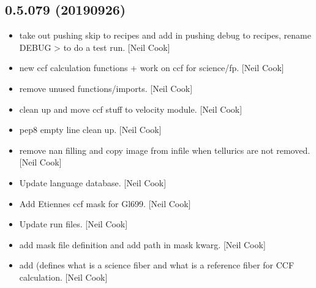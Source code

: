 \documentclass[a4paper,10pt,english]{report}
\begin{document}
\subsection{0.5.079 (2019\sphinxhyphen{}09\sphinxhyphen{}26)}
\label{\detokenize{misc/changelog:id83}}\begin{itemize}
\item {} 
 \sphinxhyphen{} take out pushing skip to recipes
and add in pushing debug to recipes, rename DEBUG \textendash{}\textgreater{}  to do a
test run. {[}Neil Cook{]}

\item {} 
 \sphinxhyphen{} new ccf calculation functions + work on
ccf for science/fp. {[}Neil Cook{]}

\item {} 
 \sphinxhyphen{} remove unused functions/imports.
{[}Neil Cook{]}

\item {} 
 \sphinxhyphen{} clean up and move ccf stuff to velocity
module. {[}Neil Cook{]}

\item {} 
 \sphinxhyphen{} pep8 empty line clean up. {[}Neil Cook{]}

\item {} 
 \sphinxhyphen{} remove nan filling and copy image from infile when
tellurics are not removed. {[}Neil Cook{]}

\item {} 
Update language database. {[}Neil Cook{]}

\item {} 
Add Etiennes ccf mask for Gl699. {[}Neil Cook{]}

\item {} 
Update run files. {[}Neil Cook{]}

\item {} 
 \sphinxhyphen{} add mask file
definition and add path in \textendash{}mask kwarg. {[}Neil Cook{]}

\item {} 
 \sphinxhyphen{} add  (defines what is a
science fiber and what is a reference fiber for CCF calculation. {[}Neil
Cook{]}


\end{itemize}
\end{document}
